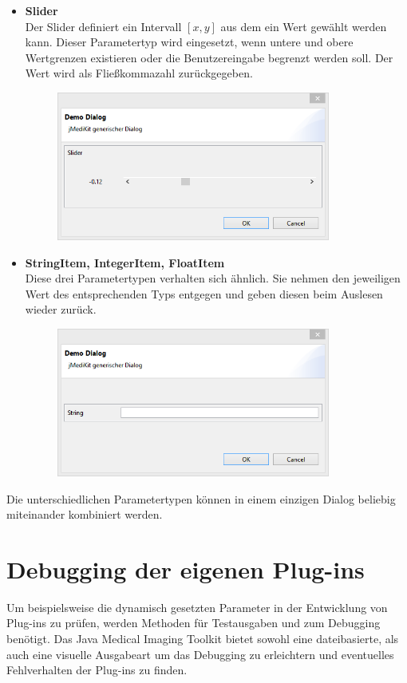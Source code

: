 \begin{itemize}
\pagebreak
\item \textbf{Slider}\\
Der Slider definiert ein Intervall $[x,y]$ aus dem ein Wert gewählt werden kann. Dieser Parametertyp wird eingesetzt, wenn untere und obere Wertgrenzen existieren oder die Benutzereingabe begrenzt werden soll. Der Wert wird als Fließkommazahl zurückgegeben.
\begin{figure}[H]
\includegraphics[angle=0,width=9cm]{./img/slider.png}
\end{figure}

\item \textbf{StringItem, IntegerItem, FloatItem}\\
Diese drei Parametertypen verhalten sich ähnlich. Sie nehmen den jeweiligen Wert des entsprechenden Typs entgegen und geben diesen beim Auslesen wieder zurück.
\begin{figure}[H]
\includegraphics[angle=0,width=9cm]{./img/stringitem.png}
\end{figure}

\end{itemize}

Die unterschiedlichen Parametertypen können in einem einzigen Dialog beliebig miteinander kombiniert werden.

\section{Debugging der eigenen Plug-ins}

Um beispielsweise die dynamisch gesetzten Parameter in der Entwicklung von Plug-ins zu prüfen, werden Methoden für Testausgaben und zum Debugging benötigt. 
Das Java Medical Imaging Toolkit bietet sowohl eine dateibasierte, als auch eine visuelle Ausgabeart um das Debugging zu erleichtern und eventuelles Fehlverhalten der Plug-ins zu finden.

